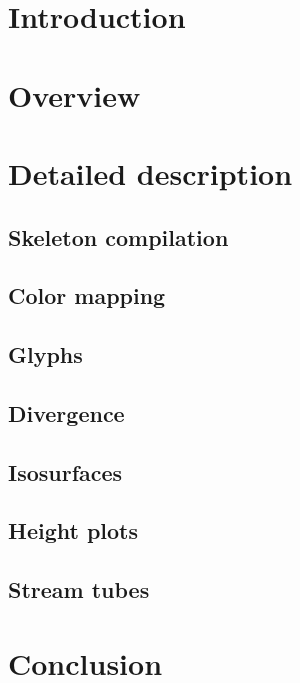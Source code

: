 \documentclass[a4paper,11pt,twoside]{report}
\begin{document}
\newcommand{\coursename}{Visualization (2IV35)}
\newcommand{\doctitle}{Practical assignment }
\newcommand{\docversion}{0.1}
\newcommand{\docdate}{\today}

\dotsspreamble

\tableofcontents

\dotssdocument

\chapter{Introduction}
\chapter{Overview}
\chapter{Detailed description}
	\section{Skeleton compilation}
	\section{Color mapping}
	\section{Glyphs}
	\section{Divergence}
	\section{Isosurfaces}
	\section{Height plots}
	\section{Stream tubes}
\chapter{Conclusion}
\end{document}
